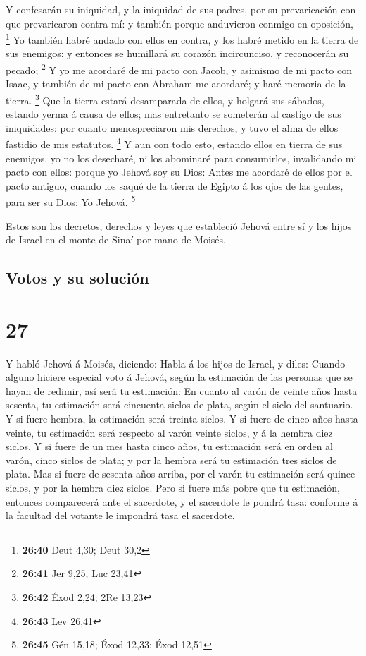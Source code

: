  Y confesarán su iniquidad, y la iniquidad de sus padres,
por su prevaricación con que prevaricaron contra mí: y también porque
anduvieron conmigo en oposición, \footnote{\textbf{26:40} Deut 4,30;
  Deut 30,2}  Yo también habré andado con ellos en
contra, y los habré metido en la tierra de sus enemigos: y entonces se
humillará su corazón incircunciso, y reconocerán su pecado; \footnote{\textbf{26:41}
  Jer 9,25; Luc 23,41}  Y yo me acordaré de mi pacto con
Jacob, y asimismo de mi pacto con Isaac, y también de mi pacto con
Abraham me acordaré; y haré memoria de la tierra. \footnote{\textbf{26:42}
  Éxod 2,24; 2Re 13,23}  Que la tierra estará desamparada
de ellos, y holgará sus sábados, estando yerma á causa de ellos; mas
entretanto se someterán al castigo de sus iniquidades: por cuanto
menospreciaron mis derechos, y tuvo el alma de ellos fastidio de mis
estatutos. \footnote{\textbf{26:43} Lev 26,41}  Y aun con
todo esto, estando ellos en tierra de sus enemigos, yo no los desecharé,
ni los abominaré para consumirlos, invalidando mi pacto con ellos:
porque yo Jehová soy su Dios:  Antes me acordaré de ellos
por el pacto antiguo, cuando los saqué de la tierra de Egipto á los ojos
de las gentes, para ser su Dios: Yo Jehová. \footnote{\textbf{26:45} Gén
  15,18; Éxod 12,33; Éxod 12,51}

 Estos son los decretos, derechos y leyes que estableció
Jehová entre sí y los hijos de Israel en el monte de Sinaí por mano de
Moisés.

\hypertarget{votos-y-su-soluciuxf3n}{%
\subsection{Votos y su solución}\label{votos-y-su-soluciuxf3n}}

\hypertarget{section-26}{%
\section{27}\label{section-26}}

 Y habló Jehová á Moisés, diciendo:  Habla á
los hijos de Israel, y diles: Cuando alguno hiciere especial voto á
Jehová, según la estimación de las personas que se hayan de redimir, así
será tu estimación:  En cuanto al varón de veinte años
hasta sesenta, tu estimación será cincuenta siclos de plata, según el
siclo del santuario.  Y si fuere hembra, la estimación
será treinta siclos.  Y si fuere de cinco años hasta
veinte, tu estimación será respecto al varón veinte siclos, y á la
hembra diez siclos.  Y si fuere de un mes hasta cinco
años, tu estimación será en orden al varón, cinco siclos de plata; y por
la hembra será tu estimación tres siclos de plata.  Mas si
fuere de sesenta años arriba, por el varón tu estimación será quince
siclos, y por la hembra diez siclos.  Pero si fuere más
pobre que tu estimación, entonces comparecerá ante el sacerdote, y el
sacerdote le pondrá tasa: conforme á la facultad del votante le impondrá
tasa el sacerdote.

